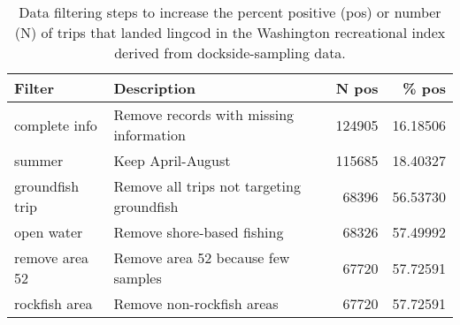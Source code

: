 
\begin{longtable}[t]{llrr}
\caption{\label{tab:reccpuewa-filtersummary}Data filtering steps to increase the percent positive (pos) or number (N) of trips that landed lingcod  in the Washington recreational index derived from dockside-sampling data.}\\
\toprule
Filter & Description & N pos & \% pos\\
\midrule
complete info & Remove records with missing information & 124905 & 16.18506\\
summer & Keep April-August & 115685 & 18.40327\\
groundfish trip & Remove all trips not targeting groundfish & 68396 & 56.53730\\
open water & Remove shore-based fishing & 68326 & 57.49992\\
remove area 52 & Remove area 52 because few samples & 67720 & 57.72591\\
\addlinespace
rockfish area & Remove non-rockfish areas & 67720 & 57.72591\\
\bottomrule
\end{longtable}
